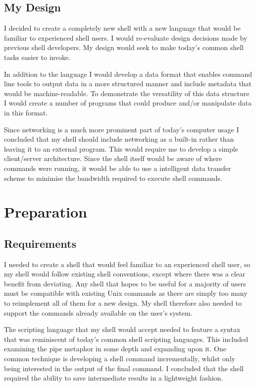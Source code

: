 \documentclass[12pt,twoside,notitlepage]{report}
\begin{document}
\section{My Design}
I decided to create a completely new shell with a new
language that would be familiar to experienced shell users. I would
re-evaluate design decisions made by previous shell developers. My
design would seek to make today's common shell tasks easier to invoke.

In addition to the language I would develop a data format that enables
command line tools to output data in a more structured manner and
include metadata that would be machine-readable. To demonstrate the
versatility of this data structure I would create a number of programs
that could produce and/or manipulate data in this format.

Since networking is a much more prominent part of today's computer usage
I concluded that my shell should include networking as a built-in
rather than leaving it to an external program. This would require me
to develop a simple client/server architecture. Since the shell itself
would be aware of where commands were running, it would be able to use
a intelligent data transfer scheme to minimise the bandwidth required
to execute shell commands.

\cleardoublepage

\chapter{Preparation}

\section{Requirements}
I needed to create a shell that would feel familiar to an experienced
shell user, so my shell would follow existing shell conventions,
except where there was a clear benefit from deviating. Any shell that
hopes to be useful for a majority of users must be compatible with
existing Unix commands as there are simply too many to reimplement all
of them for a new design. My shell therefore also needed to support
the commands already available on the user's system.

The scripting language that my shell would accept needed to feature a
syntax that was reminiscent of today's common shell scripting
languages. This included examining the pipe metaphor in some depth and
expanding upon it. One common technique is developing a shell command
incrementally, whilst only being interested in the output of the final
command. I concluded that the shell required the ability to save
intermediate results in a lightweight fashion.
\end{document}
